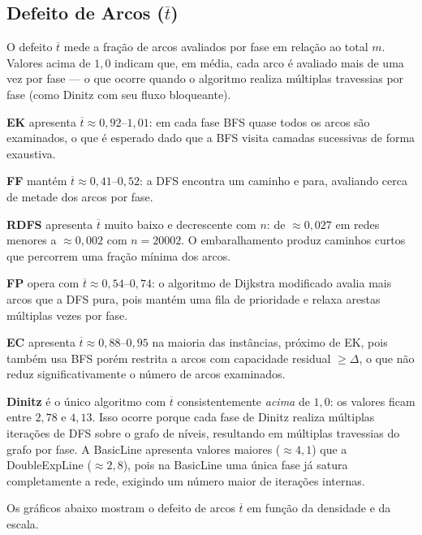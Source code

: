 \documentclass{infufrgs}
\begin{document}
\subsection{Defeito de Arcos ($\overline{t}$)}

O defeito $\overline{t}$ mede a fração de arcos avaliados por fase em relação ao total
$m$. Valores acima de $1{,}0$ indicam que, em média, cada arco é avaliado mais de uma
vez por fase — o que ocorre quando o algoritmo realiza múltiplas travessias por fase
(como Dinitz com seu fluxo bloqueante).

\textbf{EK} apresenta $\overline{t} \approx 0{,}92$--$1{,}01$: em cada fase BFS quase
todos os arcos são examinados, o que é esperado dado que a BFS visita camadas
sucessivas de forma exaustiva.

\textbf{FF} mantém $\overline{t} \approx 0{,}41$--$0{,}52$: a DFS encontra um caminho
e para, avaliando cerca de metade dos arcos por fase.

\textbf{RDFS} apresenta $\overline{t}$ muito baixo e decrescente com $n$: de
$\approx 0{,}027$ em redes menores a $\approx 0{,}002$ com $n = 20002$. O embaralhamento
produz caminhos curtos que percorrem uma fração mínima dos arcos.

\textbf{FP} opera com $\overline{t} \approx 0{,}54$--$0{,}74$: o algoritmo de Dijkstra
modificado avalia mais arcos que a DFS pura, pois mantém uma fila de prioridade e
relaxa arestas múltiplas vezes por fase.

\textbf{EC} apresenta $\overline{t} \approx 0{,}88$--$0{,}95$ na maioria das instâncias,
próximo de EK, pois também usa BFS porém restrita a arcos com capacidade residual
$\geq \Delta$, o que não reduz significativamente o número de arcos examinados.

\textbf{Dinitz} é o único algoritmo com $\overline{t}$ consistentemente \emph{acima}
de $1{,}0$: os valores ficam entre $2{,}78$ e $4{,}13$. Isso ocorre porque cada fase
de Dinitz realiza múltiplas iterações de DFS sobre o grafo de níveis, resultando em
múltiplas travessias do grafo por fase. A BasicLine apresenta valores maiores
($\approx 4{,}1$) que a DoubleExpLine ($\approx 2{,}8$), pois na BasicLine uma única
fase já satura completamente a rede, exigindo um número maior de iterações internas.

Os gráficos abaixo mostram o defeito de arcos $\overline{t}$ em função da densidade
e da escala.
\end{document}
